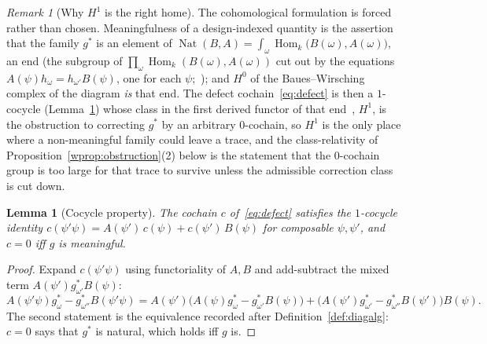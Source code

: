 \documentclass[11pt,a4paper]{article}
\theoremstyle{plain}
\newtheorem{lemma}[theorem]{Lemma}
\theoremstyle{definition}
\theoremstyle{remark}
\newtheorem{remark}[theorem]{Remark}
\DeclareMathOperator{\Nat}{Nat}
\DeclareMathOperator{\Hom}{Hom}
\begin{document}
\begin{remark}[Why $H^{1}$ is the right home]\label{rem:endH0}
The cohomological formulation is forced rather than chosen. Meaningfulness of
a design-indexed quantity is the assertion that the family $g^{*}$ is an
element of $\Nat(B,A) = \int_{\omega} \Hom_k\bigl(B(\omega),A(\omega)\bigr)$,
an end (the subgroup of $\prod_\omega \Hom_k(B(\omega),A(\omega))$ cut out
by the equations $A(\psi)h_\omega = h_{\omega'}B(\psi)$, one for each
$\psi$;~\cite[IX.5]{maclane_categories_1998}); and $H^{0}$ of the
Baues--Wirsching complex of the diagram \emph{is} that end. The defect
cochain~\eqref{eq:defect} is then a $1$-cocycle (Lemma~\ref{lem:cocycle})
whose class in the first derived functor of that
end~\cite[(8.5)]{baues_cohomology_1985}, $H^{1}$, is the obstruction to correcting $g^{*}$ by an arbitrary $0$-cochain,
so $H^{1}$ is the only place where a non-meaningful family could leave a trace,
and the class-relativity of
Proposition~\ref{wprop:obstruction}(2) below is the statement that the
$0$-cochain group is too large for that trace to survive unless the admissible
correction class is cut down.
\end{remark}

\begin{lemma}[Cocycle property]\label{lem:cocycle}
The cochain $c$ of~\eqref{eq:defect} satisfies the $1$-cocycle identity
$c(\psi'\psi) = A(\psi')\,c(\psi) + c(\psi')\,B(\psi)$ for composable
$\psi,\psi'$, and $c = 0$ iff $g$ is meaningful.
\end{lemma}

\begin{proof}
Expand $c(\psi'\psi)$ using functoriality of $A, B$ and add-subtract the
mixed term $A(\psi')g^{*}_{\omega'}B(\psi)$:
\[
A(\psi'\psi)g^{*}_{\omega} - g^{*}_{\omega''}B(\psi'\psi)
= A(\psi')\bigl(A(\psi)g^{*}_{\omega} - g^{*}_{\omega'}B(\psi)\bigr)
+ \bigl(A(\psi')g^{*}_{\omega'} - g^{*}_{\omega''}B(\psi')\bigr)B(\psi).
\]
The second statement is the equivalence recorded after
Definition~\ref{def:diagalg}: $c = 0$ says that $g^{*}$ is natural, which
holds iff $g$ is.
\end{proof}
\end{document}
